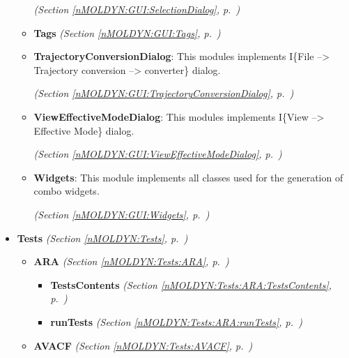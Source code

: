 \begin{itemize}
\begin{itemize}
  \textit{(Section \ref{nMOLDYN:GUI:SelectionDialog}, p.~\pageref{nMOLDYN:GUI:SelectionDialog})}

    \item \textbf{Tags}
  \textit{(Section \ref{nMOLDYN:GUI:Tags}, p.~\pageref{nMOLDYN:GUI:Tags})}

    \item \textbf{TrajectoryConversionDialog}: This modules implements I\{File --{\textgreater} Trajectory conversion --{\textgreater} converter\} dialog.



  \textit{(Section \ref{nMOLDYN:GUI:TrajectoryConversionDialog}, p.~\pageref{nMOLDYN:GUI:TrajectoryConversionDialog})}

    \item \textbf{ViewEffectiveModeDialog}: This modules implements I\{View --{\textgreater} Effective Mode\} dialog.



  \textit{(Section \ref{nMOLDYN:GUI:ViewEffectiveModeDialog}, p.~\pageref{nMOLDYN:GUI:ViewEffectiveModeDialog})}

    \item \textbf{Widgets}: This module implements all classes used for the generation of combo widgets. 


  \textit{(Section \ref{nMOLDYN:GUI:Widgets}, p.~\pageref{nMOLDYN:GUI:Widgets})}

  \end{itemize}
\item \textbf{Tests}
  \textit{(Section \ref{nMOLDYN:Tests}, p.~\pageref{nMOLDYN:Tests})}

  \begin{itemize}
\setlength{\parskip}{0ex}
    \item \textbf{ARA}
  \textit{(Section \ref{nMOLDYN:Tests:ARA}, p.~\pageref{nMOLDYN:Tests:ARA})}

      \begin{itemize}
    \setlength{\parskip}{0ex}
        \item \textbf{TestsContents}
  \textit{(Section \ref{nMOLDYN:Tests:ARA:TestsContents}, p.~\pageref{nMOLDYN:Tests:ARA:TestsContents})}

        \item \textbf{runTests}
  \textit{(Section \ref{nMOLDYN:Tests:ARA:runTests}, p.~\pageref{nMOLDYN:Tests:ARA:runTests})}

      \end{itemize}
    \item \textbf{AVACF}
  \textit{(Section \ref{nMOLDYN:Tests:AVACF}, p.~\pageref{nMOLDYN:Tests:AVACF})}


\end{itemize}
\end{itemize}
